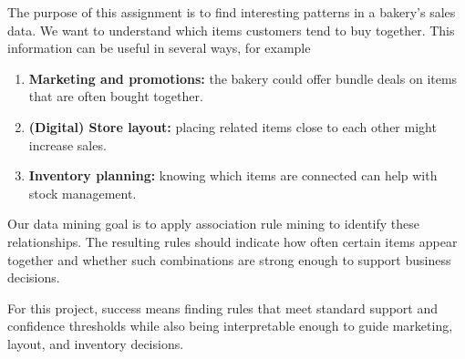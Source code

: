 \label{chap:business-understanding}

The purpose of this assignment is to find interesting patterns in a bakery's sales data. 
We want to understand which items customers tend to buy together. 
This information can be useful in several ways, for example\:

\begin{enumerate}
\item \textbf{Marketing and promotions:} 
the bakery could offer bundle deals on items that are often bought together.

\item \textbf{(Digital) Store layout:} 
placing related items close to each other might increase sales.

\item \textbf{Inventory planning:} 
knowing which items are connected can help with stock management.
\end{enumerate}

Our data mining goal is to apply association rule mining to identify these relationships. 
The resulting rules should indicate how often certain items appear together 
and whether such combinations are strong enough to support business decisions.

For this project, success means finding rules that meet standard support 
and confidence thresholds while also being interpretable enough to guide 
marketing, layout, and inventory decisions.
